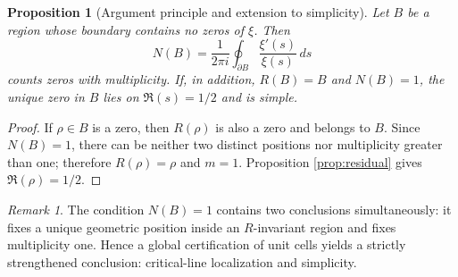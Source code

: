 \documentclass[11pt]{amsart}
\newtheorem{proposition}[theorem]{Proposition}
\theoremstyle{definition}
\theoremstyle{remark}
\newtheorem{remark}[theorem]{Remark}
\begin{document}
\begin{proposition}[Argument principle and extension to simplicity]
Let $B$ be a region whose boundary contains no zeros of $\xi$. Then
\begin{equation}
 N(B)=\frac{1}{2\pi i}\oint_{\partial B}\frac{\xi'(s)}{\xi(s)}\,ds
\end{equation}
counts zeros with multiplicity. If, in addition, $R(B)=B$ and $N(B)=1$, the unique zero in $B$ lies on $\Re(s)=1/2$ and is simple.
\end{proposition}

\begin{proof}
If $\rho\in B$ is a zero, then $R(\rho)$ is also a zero and belongs to $B$. Since $N(B)=1$, there can be neither two distinct positions nor multiplicity greater than one; therefore $R(\rho)=\rho$ and $m=1$. Proposition \ref{prop:residual} gives $\Re(\rho)=1/2$.
\end{proof}

\begin{remark}
The condition $N(B)=1$ contains two conclusions simultaneously: it fixes a unique geometric position inside an $R$-invariant region and fixes multiplicity one. Hence a global certification of unit cells yields a strictly strengthened conclusion: critical-line localization and simplicity.
\end{remark}
\end{document}

